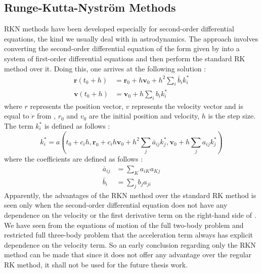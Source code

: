 \subsection{Runge-Kutta-Nystr\"om Methods}
\gls{RKN} methods have been developed especially for second-order differential equations, the kind we usually deal with in astrodynamics. The approach involves converting the second-order differential equation of the form given by  into a system of first-order differential equations and then perform the standard \gls{RK} method over it. Doing this, one arrives at the following solution \cite{gillbook}:
\begin{equation}
\label{rkn1}
\begin{aligned}
\mathbf{r}(t_0+h) &= \mathbf{r}_0 + h\mathbf{v}_0 + h^2 \sum_i \bar{b}_i k_i^* \\
\mathbf{v}(t_0+h) &= \mathbf{v}_0 + h\sum_i b_i k_i^*
\end{aligned}
\end{equation}
%
where $r$ represents the position vector, $v$ represents the velocity vector and is equal to $\dot{r}$ from , $r_0$ and $v_0$ are the initial position and velocity, $h$ is the step size. The term $k_i^*$ is defined as follows \cite{gillbook}:
\begin{equation}
k_i^* = a\left( t_0 + c_ih, \mathbf{r}_0 + c_ih\mathbf{v}_0 + h^2 \sum_j \bar{a}_{ij} k_j^*, \mathbf{v}_0+h\sum_j a_{ij} k_j^*  \right)
\end{equation}
%
where the coefficients are defined as follows \cite{gillbook}:
\begin{equation}
\label{rkn_coeff}
\begin{aligned}
\bar{a}_{ij} &= \sum_K a_{iK} a_{Kj} \\
\bar{b}_i &= \sum_j b_j a_{ji}
\end{aligned}
\end{equation}
%
Apparently, the advantages of the \gls{RKN} method over the standard \gls{RK} method is seen only when the second-order differential equation does not have any dependence on the velocity or the first derivative term on the right-hand side of  \cite{gillbook}. We have seen from the equations of motion of the full two-body problem and restricted full three-body problem that the acceleration term always has explicit dependence on the velocity term. So an early conclusion regarding only the \gls{RKN} method can be made that since it does not offer any advantage over the regular \gls{RK} method, it shall not be used for the future thesis work.

